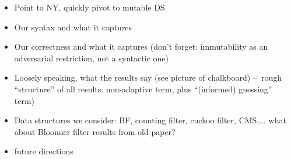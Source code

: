\newcommand{\err}{\varfont{err}}
\newcommand{\ct}{\varfont{ct}}
\renewcommand{\st}{\varfont{st}}
\newcommand{\salt}{Z}

\newcommand{\REPO}{\oraclefont{Rep}}
\newcommand{\UPO}{\oraclefont{Up}}
\newcommand{\QRYO}{\oraclefont{Qry}}
\newcommand{\PRFO}{\oraclefont{F}}

\newcommand{\xx}{\vectorfont{x}}
\newcommand{\vv}{\vectorfont{v}}
\newcommand{\REVO}{\mathbf{Reveal}}
\newcommand{\HASHO}{\oraclefont{Hash}}
\newcommand{\INTO}{\oraclefont{Int}}
\newcommand{\diffplus}[1]{\fbox{#1}}
\newcommand{\diffplusbox}[1]{\fbox{\parbox{\dimexpr\textwidth-2\fboxsep-2\fboxrule\relax}{#1}}}
\newcommand{\diffminus}[1]{\colorbox{lightgray}{#1}}
\newcommand{\diffminusbox}[1]{\colorbox{lightgray}{\parbox{\dimexpr\textwidth-2\fboxsep-2\fboxrule\relax}{#1}}}
\newcommand{\hh}{\vectorfont{h}}
\newcommand{\fff}{\schemefont{Fn}}
\newcommand{\Rnd}{\schemefont{Rand}}
\newcommand{\Repx}{\Rep1}
\newcommand{\Qryx}{\Qry1}
\newcommand{\Upx}{\Up1}
\newcommand{\Ans}{\varfont{Ans}}
\newcommand{\setE}{\mathcal{E}}
\newcommand{\Resp}{\varfont{Resp}}
\def\ticks(#1,#2){\procfont{T}_{\hspace*{-1.5pt}#1}({#2})}
\newcommand{\highlighto}[1]{\colorbox{lightgray}{$\scriptstyle #1$}}
\newcommand{\highlight}[1]{\colorbox{lightgray}{$\displaystyle #1$}}

\def\v.#1{\boldsymbol{#1}}
\newcommand{\bmap}{{B}}
\newcommand{\cmap}{{B}}
\newcommand{\hw}{{w}}

\newcommand{\emptystring}{\varepsilon}

\begin{itemize}
\item Point to NY, quickly pivot to mutable DS
\item Our syntax and what it captures
\item Our correctness and what it captures (don't forget: immutability as an
  adversarial restriction, not a syntactic one) 
\item Loosely speaking, what the results say (see picture of
  chalkboard) --~rough ``structure'' of all results: non-adaptive
  term, plus ``(informed) guessing'' term)
\item Data structures we consider: BF, counting filter, cuckoo filter,
  CMS,... what about Bloomier filter results from old paper?
\item future directions
\end{itemize}

